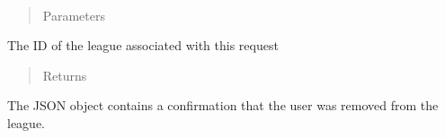 \documentclass[letterpaper,10pt,english]{sphinxmanual}
\begin{document}
\begin{fulllineitems}
\label{\detokenize{tiger_leagues/readme:tiger_leagues.league.leave_league}}~\begin{quote}\begin{description}
\item[{Parameters}] \leavevmode
{} \textendash{} 

\end{description}\end{quote}

The ID of the league associated with this request
\begin{quote}\begin{description}
\item[{Returns}] \leavevmode
{}

\end{description}\end{quote}

The JSON object contains a confirmation that the user was removed from the 
league.

\end{fulllineitems}

\end{document}
